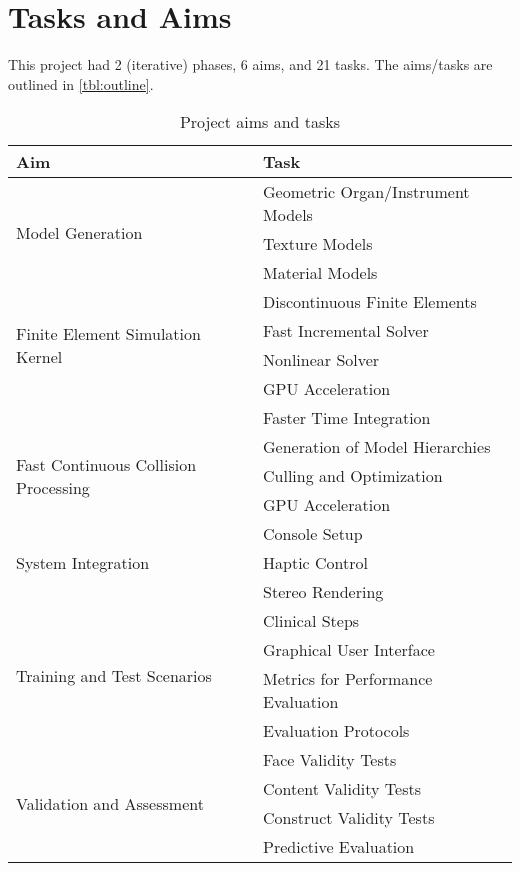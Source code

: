\section{Tasks and Aims}\label{sec:aims}

This project had 2 (iterative) phases, 6 aims, and 21 tasks. The aims/tasks are outlined in \autoref{tbl:outline}.

\begin{table}
\centering
\begin{tabular}{ll}
  \textbf{Aim} & \textbf{Task}\\
  \toprule
  \multirow[t]{3}{*}{Model Generation}
  & Geometric Organ/Instrument Models\\
  & Texture Models\\
  & Material Models\\
  \midrule
  \multirow[t]{4}{*}{Finite Element Simulation Kernel}
  & Discontinuous Finite Elements\\
  & Fast Incremental Solver\\
  & Nonlinear Solver\\
  & GPU Acceleration\\
  & Faster Time Integration\\
  \midrule
  \multirow[t]{3}{*}{Fast Continuous Collision Processing}
  & Generation of Model Hierarchies\\
  & Culling and Optimization\\
  & GPU Acceleration\\
  \midrule
  \multirow[t]{3}{*}{System Integration}
  & Console Setup\\
  & Haptic Control\\
  & Stereo Rendering\\
  \midrule
  \multirow[t]{4}{*}{Training and Test Scenarios}
  & Clinical Steps\\
  & Graphical User Interface\\
  & Metrics for Performance Evaluation\\
  & Evaluation Protocols\\
  \midrule
  \multirow[t]{4}{*}{Validation and Assessment}
  & Face Validity Tests\\
  & Content Validity Tests\\
  & Construct Validity Tests\\
  & Predictive Evaluation\\
  \bottomrule
\end{tabular}
\caption{Project aims and tasks}\label{tbl:outline}
\end{table}


